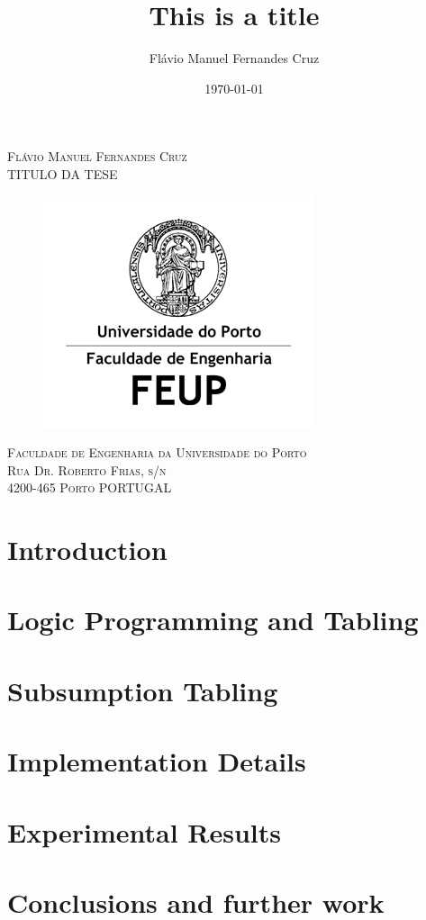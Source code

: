 \documentclass[11pt]{report}
\title{\fontsize{20}{30}\bfseries This is a title}
\author{Flávio Manuel Fernandes Cruz \\}
\date{\today}
\begin{document}
  
\begin{titlepage}

\begin{center}
  
\textsc{\large Flávio Manuel Fernandes Cruz}\\[1.5cm]

\textsc{\LARGE TITULO DA TESE}
\begin{figure}[ht]
  \centering
  \includegraphics[scale=0.7]{04.png}
\end{figure}


\textsc{\large Faculdade de Engenharia da Universidade do Porto\\ \small Rua Dr. Roberto Frias, s/n \\ 4200-465 Porto PORTUGAL}\\[1.5cm]
  
\end{center}
\end{titlepage}

\tableofcontents
\listoffigures
\listoftables
\lstlistoflistings
\listofalgorithms
\clearpage

\chapter{Introduction}


\chapter{Logic Programming and Tabling}


\chapter{Subsumption Tabling}
\chapter{Implementation Details}
\chapter{Experimental Results}
\chapter{Conclusions and further work}
  
\renewcommand{\bibname}{References}
{}



\end{document}
